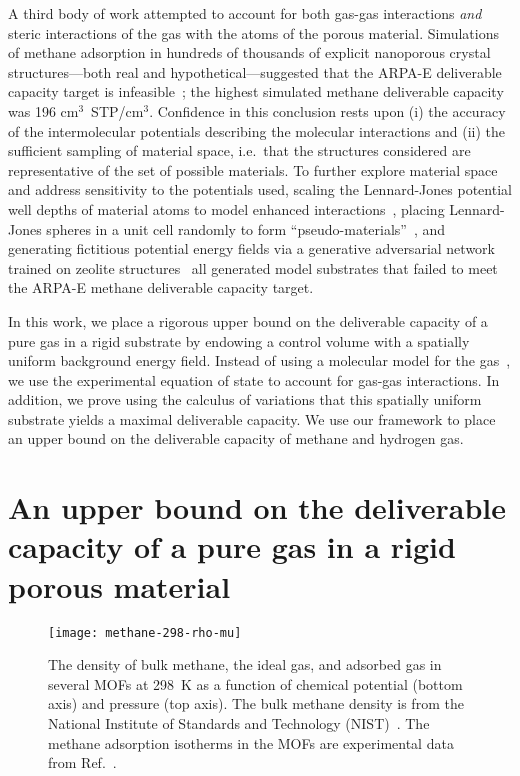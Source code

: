 A third body of work attempted to account for both gas-gas interactions
\emph{and} steric interactions of the gas with the atoms of the porous
material. Simulations of methane adsorption in hundreds of thousands of
explicit nanoporous crystal structures---both real and hypothetical---suggested
that the ARPA-E deliverable capacity target is
infeasible~\cite{simon2015materials}; the highest simulated methane deliverable
capacity was 196 cm$^3$~STP/cm$^3$. Confidence in this conclusion rests upon
(i) the accuracy of the intermolecular potentials describing the molecular
interactions and (ii) the sufficient sampling of material space, i.e.\ that the
structures considered are representative of the set of possible materials. To
further explore material space and address sensitivity to the potentials used,
scaling the Lennard-Jones potential well depths of material atoms to model
enhanced interactions~\cite{gomez2014exploring}, placing Lennard-Jones spheres
in a unit cell randomly to form ``pseudo-materials''~\cite{kaija2018high}, and
generating fictitious potential energy fields via a generative adversarial
network trained on zeolite structures~\cite{lee2019predicting} all generated
model substrates that failed to meet the ARPA-E methane deliverable
capacity target.


In this work, we place a rigorous upper bound on the deliverable capacity of a
pure gas in a rigid substrate by endowing a control volume with a spatially
uniform background energy field. Instead of using a molecular model for the
gas~\cite{gomez2017impact}, we use the experimental equation of state to
account for gas-gas interactions. In addition, we prove using the calculus of
variations that this spatially uniform substrate yields a maximal deliverable
capacity. We use our framework to place an upper bound on the deliverable
capacity of methane and hydrogen gas.

\section{An upper bound on the deliverable capacity of a pure gas in a rigid porous material}\label{sec:upper-bound}
\begin{figure}
  \centering
  \texttt{[image: methane-298-rho-mu]}
  \caption{The density of bulk methane, the ideal gas, and adsorbed gas in several MOFs at 298\ K as a function of chemical potential (bottom axis) and pressure (top axis). The bulk methane density is from the National Institute of Standards and Technology (NIST)~\cite{nist}. The methane adsorption isotherms in the MOFs are experimental data from Ref.~\cite{mason2014evaluating, furukawa2009storage}.
  }
  \label{fig:density-vs-mu-ch4}
\end{figure}

